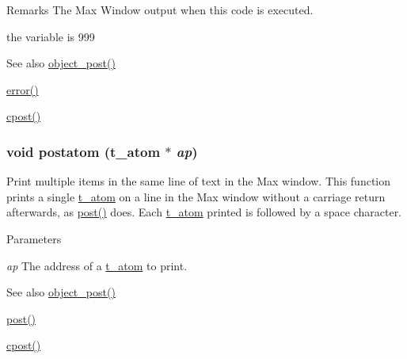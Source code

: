 \begin{DoxyRemark}{Remarks}
The Max Window output when this code is executed. 
\begin{DoxyCode}
    the variable is 999
\end{DoxyCode}

\end{DoxyRemark}
\begin{DoxySeeAlso}{See also}
\hyperlink{group__console_gafb92b17363269d4d26de1823cbc2492d}{object\_\-post()} 

\hyperlink{group__console_gaa7733e30b2951f225e24dca1ed4632b2}{error()} 

\hyperlink{group__console_ga94fff7e4ee19b8db6904a009117e0667}{cpost()} 
\end{DoxySeeAlso}
\hypertarget{group__console_gaef84325d992e0afa14b2e7b0c0515601}{
\subsubsection[{postatom}]{\setlength{\rightskip}{0pt plus 5cm}void postatom ({\bf t\_\-atom} $\ast$ {\em ap})}}
\label{group__console_gaef84325d992e0afa14b2e7b0c0515601}


Print multiple items in the same line of text in the Max window. This function prints a single \hyperlink{structt__atom}{t\_\-atom} on a line in the Max window without a carriage return afterwards, as \hyperlink{group__console_ga3714108f42b44384b4d58009eafc1806}{post()} does. Each \hyperlink{structt__atom}{t\_\-atom} printed is followed by a space character.


\begin{DoxyParams}{Parameters}
\item[{\em ap}]The address of a \hyperlink{structt__atom}{t\_\-atom} to print.\end{DoxyParams}
\begin{DoxySeeAlso}{See also}
\hyperlink{group__console_gafb92b17363269d4d26de1823cbc2492d}{object\_\-post()} 

\hyperlink{group__console_ga3714108f42b44384b4d58009eafc1806}{post()} 

\hyperlink{group__console_ga94fff7e4ee19b8db6904a009117e0667}{cpost()} 
\end{DoxySeeAlso}
